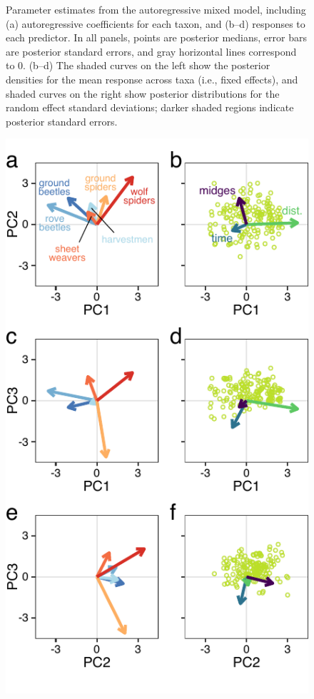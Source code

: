 \documentclass[12pt]{article}
\begin{document}
\begin{figure}
\begin{minipage}[b]{3in}
\caption{\label{fig:coefs}
Parameter estimates from the autoregressive mixed model, including
(a) autoregressive coefficients for each taxon, and
(b--d) responses to each predictor.
In all panels, points are posterior medians,
error bars are posterior standard errors, and
gray horizontal lines correspond to 0.
(b--d) The shaded curves on the left show the posterior densities for the 
mean response across taxa (i.e., fixed effects), and 
shaded curves on the right show posterior distributions for 
the random effect standard deviations;
darker shaded regions indicate posterior standard errors.
}
\end{minipage}
\end{figure}



\clearpage

\begin{figure}
\centering
\begin{minipage}[c]{3.5in}
\includegraphics{fig3.pdf}

\end{minipage}
\end{figure}
\end{document}
